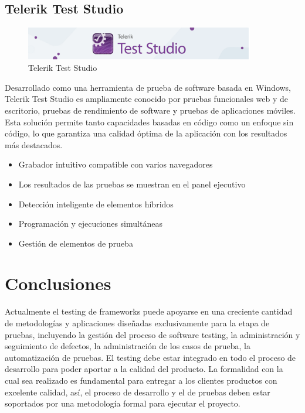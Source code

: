 \documentclass[12pt,letterpaper]{article}
\begin{document}
\subsection{Telerik Test Studio}
\begin{figure}[h]
    \begin{center}
    \includegraphics[width=10cm]{./Imagenes/image8.png}
    \caption{Telerik Test Studio}
    \label{rg8}
    \end{center}
    \end{figure}
Desarrollado como una herramienta de prueba de software 
basada en Windows, Telerik Test Studio es ampliamente conocido 
por pruebas funcionales web y de escritorio, pruebas de rendimiento 
de software y pruebas de aplicaciones móviles. Esta solución permite 
tanto capacidades basadas en código como un enfoque sin código, lo que 
garantiza una calidad óptima de la aplicación con los resultados más destacados.
\begin{itemize}
    \item Grabador intuitivo compatible con varios navegadores
    \item Los resultados de las pruebas se muestran en el panel ejecutivo
    \item Detección inteligente de elementos híbridos
    \item Programación y ejecuciones simultáneas
    \item Gestión de elementos de prueba

\end{itemize}
\section{Conclusiones}
Actualmente el testing de frameworks puede apoyarse en una creciente cantidad de metodologías y aplicaciones diseñadas exclusivamente para la etapa de pruebas, incluyendo la gestión del proceso de software testing, la administración y seguimiento de defectos, la administración de los casos de prueba, la automatización de pruebas.
El testing debe estar integrado en todo el proceso de desarrollo para poder aportar a la calidad del producto. La formalidad con la cual sea realizado es fundamental para entregar a los clientes productos con excelente calidad, así, el proceso de desarrollo y el de pruebas deben estar soportados por una metodología formal para ejecutar el proyecto.
\end{document}
